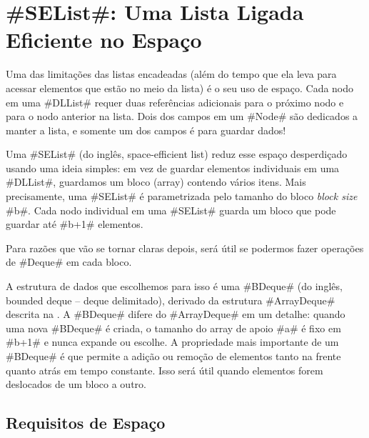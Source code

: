 \section{#SEList#: Uma Lista Ligada Eficiente no Espaço}
%
%
Uma das limitações das listas encadeadas (além do tempo que ela leva para
acessar elementos que estão no meio da lista) é o seu uso de espaço.
Cada nodo em uma #DLList# requer duas referências adicionais para o próximo nodo e para o nodo anterior na lista. Dois dos campos em um #Node# são dedicados a manter a lista, e somente um dos campos é para guardar dados!

Uma #SEList# (do inglês, space-efficient list) reduz esse espaço desperdiçado usando uma ideia simples: 
em vez de guardar elementos individuais em uma #DLList#,
guardamos um bloco (array) contendo vários itens.
Mais precisamente, uma 
#SEList# é parametrizada pelo tamanho do bloco \emph{block size} #b#.
Cada nodo individual em uma #SEList# guarda um bloco que pode guardar até #b+1# elementos.

Para razões que vão se tornar claras depois, será útil se podermos fazer operações de #Deque# em cada bloco.

A estrutura de dados que escolhemos para isso é uma 
#BDeque# (do inglês, bounded deque -- deque delimitado),
%
%
%
%
derivado da estrutura #ArrayDeque#
descrita na . A #BDeque# difere do #ArrayDeque#
em um detalhe: quando uma nova #BDeque# é criada, o tamanho do array de apoio #a#
é fixo em #b+1# e nunca expande ou escolhe.
A propriedade mais importante de um #BDeque# é que permite a adição ou remoção
de elementos tanto na frente quanto atrás em tempo constante.
Isso será útil quando elementos forem deslocados de um bloco a outro.




\subsection{Requisitos de Espaço}

